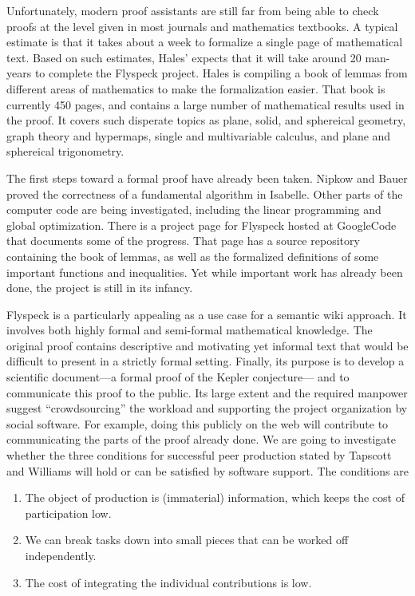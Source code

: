   Unfortunately, modern proof assistants are still far from being able to check
proofs at the level given in most journals and mathematics textbooks.  A typical
estimate is that it takes about a week to formalize a single page of mathematical
text.  Based on such estimates, Hales' expects that it will take 
around 20 man-years to complete the Flyspeck project.  
Hales is compiling a book\cite{Hales:2007:FlyspeckBook}
of lemmas from different areas of mathematics to make the formalization easier.    
That book is currently 450 pages, and contains a large number of mathematical
results used in the proof.  It covers such disperate topics
as plane, solid, and sphereical geometry, graph theory and hypermaps, single and
multivariable calculus, and plane and sphereical trigonometry.

The first steps toward a formal proof have already been taken.  Nipkow
and Bauer\cite{Nipkow:2005:Tame} proved the correctness of a
fundamental algorithm in Isabelle.  Other parts of the computer code
are being investigated, including the linear programming and global
optimization.  There is a project
page\cite{website:FlyspeckProjectPage} for Flyspeck hosted at
GoogleCode\cite{website:GoogleCode} that documents some of the
progress.  That page has a source repository containing the book of
lemmas, as well as the formalized definitions of some important
functions and inequalities.  Yet while important work has already been done,
the project is still in its infancy.  

Flyspeck is a particularly appealing as a use case
for a semantic wiki approach. It
involves both highly formal and semi-formal mathematical knowledge.   
The original proof contains descriptive and motivating yet informal text that would
be difficult to present in a strictly formal setting.
Finally, its purpose is to develop a scientific document---a formal proof of the Kepler
conjecture--- and to communicate this proof to the public.  Its large extent and the
required manpower suggest ``crowdsourcing'' the workload and supporting the project
organization by social software.  For example, doing this publicly on the web will contribute to
communicating the parts of the proof already done.  We are going to investigate whether
the three conditions for successful peer production stated by Tapscott and
Williams\cite{wikinomics} will hold or can be satisfied by software support.
The conditions are
\begin{enumerate} 
\item The object of production is (immaterial) information, which
  keeps the cost of participation low.
\item We can break tasks down into small pieces that can be worked
  off independently.
\item The cost of integrating the individual contributions is low.
\end{enumerate} 



